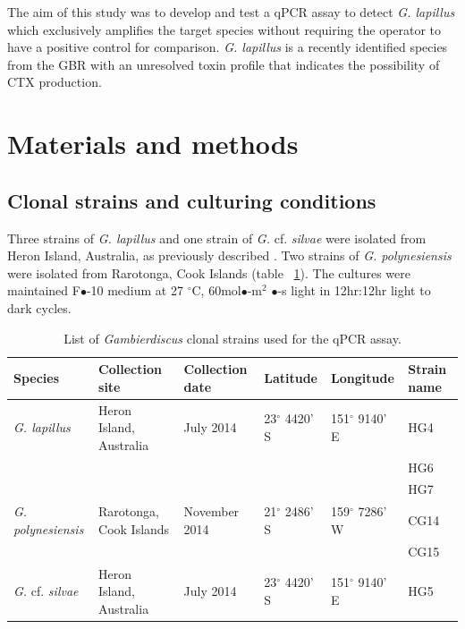 \documentclass[12pt]{article}
\begin{document}
The aim of this study was to develop and test a qPCR assay to detect \emph{G. lapillus} %
which exclusively amplifies the target species without requiring the operator to have a positive control for comparison. 
\emph{G. lapillus} is a recently identified species from the GBR with an unresolved toxin profile that indicates the possibility of CTX production.
\newpage
\section*{Materials and methods}
\subsection*{Clonal strains and culturing conditions}
\FloatBarrier
Three strains of \emph{G. lapillus} and one strain of \emph{G.} cf. \emph{silvae} were isolated from Heron Island, Australia, as previously described \citep{kretzschmar2017characterization}. 
Two strains of \emph{G. polynesiensis} were isolated from Rarotonga, Cook Islands (table ~\ref{tbl:StrainTable}). 
The cultures were maintained F$\bullet$-10 medium at 27 $^{\circ}$C, 60mol$\bullet$-m$^{2}$ $\bullet$-s light in 12hr:12hr light to dark cycles.
\begin{table}  
\caption{List of \emph{Gambierdiscus} clonal strains used for the qPCR assay.}
\label{tbl:StrainTable}
\begin{tabular}{ | p{2cm} | p{2cm} | p{2cm}| p{3cm} | p{3cm} | p{2cm} | }
\hline
\textbf{Species} & \textbf{Collection site} & \textbf{Collection date} &\textbf{Latitude} & \textbf{Longitude} & \textbf{Strain name} \\
\hline
\emph{G. lapillus} &Heron Island, Australia &July 2014 &23$^{\circ}$ 4420' S&151$^{\circ}$ 9140' E & HG4 \\
\hline
&&&&& HG6\\
\hline
&&&& &HG7\\
\hline
\emph{G. polynesiensis}&Rarotonga, Cook Islands&November 2014 &21$^{\circ}$ 2486' S&159$^{\circ}$ 7286' W & CG14 \\
\hline
&&&&&CG15\\
\hline
\emph{G.} cf. \emph{silvae}&Heron Island, Australia &July 2014 &23$^{\circ}$ 4420' S&151$^{\circ}$ 9140' E& HG5\\
\hline
\end{tabular}
\end{table}
\FloatBarrier
\end{document}
